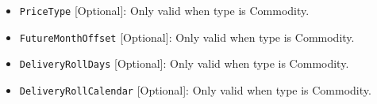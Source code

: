 \begin{itemize}
\item \lstinline!PriceType! [Optional]:
Only valid when type is Commodity. 

\item \lstinline!FutureMonthOffset! [Optional]:
Only valid when type is Commodity.

\item \lstinline!DeliveryRollDays! [Optional]:
Only valid when type is Commodity.

\item \lstinline!DeliveryRollCalendar! [Optional]:
Only valid when type is Commodity.


\end{itemize}

